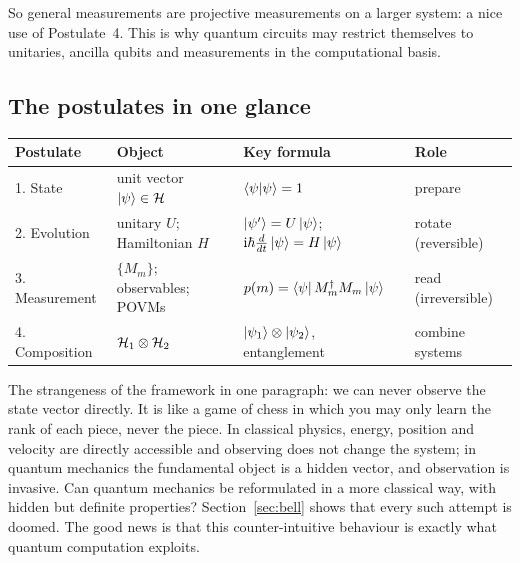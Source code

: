 So general measurements are projective measurements on a larger system: a nice use of Postulate~4. This is why quantum circuits may restrict themselves to unitaries, ancilla qubits and measurements in the computational basis.

\subsection{The postulates in one glance}

\begin{center}
\small
\begin{tabular}{@{}llll@{}}
  \toprule
  Postulate & Object & Key formula & Role\\
  \midrule
  1. State & unit vector $\left|\psi\right\rangle\in\mathcal{H}$ & $\left\langle\psi\middle|\psi\right\rangle=1$ & prepare\\
  2. Evolution & unitary $U$; Hamiltonian $H$ & $\left|\psi'\right\rangle=U\left|\psi\right\rangle$; $\mathrm{i}\hbar\tfrac{d}{dt}\left|\psi\right\rangle=H\left|\psi\right\rangle$ & rotate (reversible)\\
  3. Measurement & $\{M_m\}$; observables; POVMs & $p(m)=\left\langle\psi\right| M_m^\dagger M_m\left|\psi\right\rangle$ & read (irreversible)\\
  4. Composition & $\mathcal{H}_1\otimes\mathcal{H}_2$ & $\left|\psi_1\right\rangle\otimes\left|\psi_2\right\rangle$, entanglement & combine systems\\
  \bottomrule
\end{tabular}
\end{center}

The strangeness of the framework in one paragraph: we can never observe the state vector directly. It is like a game of chess in which you may only learn the rank of each piece, never the piece. In classical physics, energy, position and velocity are directly accessible and observing does not change the system; in quantum mechanics the fundamental object is a hidden vector, and observation is invasive.
Can quantum mechanics be reformulated in a more classical way, with hidden but definite properties? Section~\ref{sec:bell} shows that every such attempt is doomed. The good news is that this counter-intuitive behaviour is exactly what quantum computation exploits.

